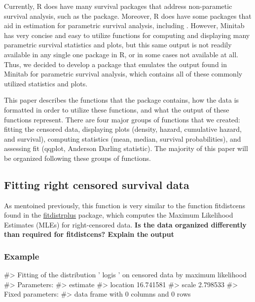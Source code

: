Currently, R does have many survival packages that address non-parametic
survival analysis, such as the  package. Moreover, R does
have some packages that aid in estimation for parametric survival
analysis, including . However, Minitab has very
concise and easy to utilize functions for computing and displaying many
parametric survival statistics and plots, but this same output is not
readily available in any single one package in R, or in some cases not
available at all. Thus, we decided to develop a package that emulates
the output found in Minitab for parametric survival analysis, which
contains all of these commonly utilized statistics and plots.

This paper describes the functions that the  package
contains, how the data is formatted in order to utilize these functions,
and what the output of these functions represent. There are four major
groups of functions that we created: fitting the censored data,
displaying plots (density, hazard, cumulative hazard, and survival),
computing statistics (mean, median, survival probabilities), and
assessing fit (qqplot, Anderson Darling statistic). The majority of this
paper will be organized following these groups of functions.

\hypertarget{fitting-right-censored-survival-data}{%
\subsection{Fitting right censored survival
data}\label{fitting-right-censored-survival-data}}

As mentoined previously, this function is very similar to the function
fitdistcens found in the
\href{https://cran.r-project.org/web/packages/fitdistrplus/index.html}{fitdistrplus}
package, which computes the Maximum Likelihood Estimates (MLEs) for
right-censored data. \textbf{Is the data organized differently than
required for fitdistcens? Explain the output}

\hypertarget{example}{%
\subsubsection{Example}\label{example}}

\begin{Schunk}
\begin{Soutput}
#> Fitting of the distribution ' logis ' on censored data by maximum likelihood 
#> Parameters:
#>           estimate
#> location 16.741581
#> scale     2.798533
#> Fixed parameters:
#> data frame with 0 columns and 0 rows
\end{Soutput}
\end{Schunk}

